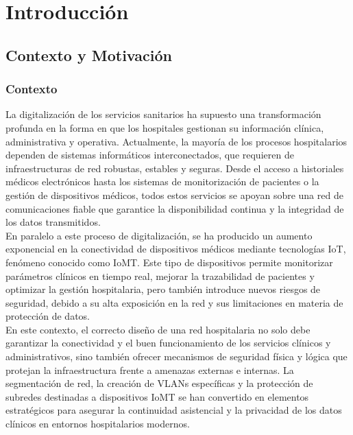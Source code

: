 
\chapter{Introducción}

\section{Contexto y Motivación}
\subsection{Contexto}
La digitalización de los servicios sanitarios ha supuesto una transformación profunda en la forma en que los hospitales gestionan su información clínica, administrativa y 
operativa. Actualmente, la mayoría de los procesos hospitalarios dependen de sistemas informáticos interconectados, que requieren de infraestructuras de red robustas, estables 
y seguras. Desde el acceso a historiales médicos electrónicos hasta los sistemas de monitorización de pacientes o la gestión de dispositivos médicos, todos estos servicios 
se apoyan sobre una red de comunicaciones fiable que garantice la disponibilidad continua y la integridad de los datos transmitidos. \\ 

En paralelo a este proceso de digitalización, se ha producido un aumento exponencial en la conectividad de dispositivos médicos mediante tecnologías \ac{IoT}, fenómeno conocido 
como \ac{IoMT}. Este tipo de dispositivos permite monitorizar parámetros clínicos en tiempo real, mejorar la trazabilidad de pacientes y optimizar 
la gestión hospitalaria, pero también introduce nuevos riesgos de seguridad, debido a su alta exposición en la red y sus limitaciones en materia de protección de datos. \\ 

En este contexto, el correcto diseño de una red hospitalaria no solo debe garantizar la conectividad y el buen funcionamiento de los servicios clínicos y administrativos, 
sino también ofrecer mecanismos de seguridad física y lógica que protejan la infraestructura frente a amenazas externas e internas. La segmentación de red, la creación de 
\ac{VLAN}s específicas y la protección de subredes destinadas a dispositivos IoMT se han convertido en elementos estratégicos para asegurar la continuidad asistencial y la 
privacidad de los datos clínicos en entornos hospitalarios modernos.

